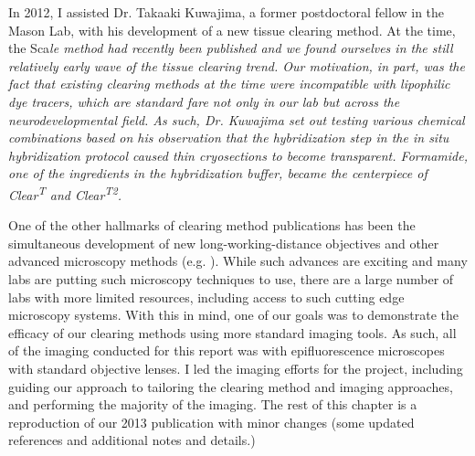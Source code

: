 In 2012, I assisted Dr. Takaaki Kuwajima, a former postdoctoral fellow in the Mason Lab, with his development of a new tissue clearing method.
At the time, the Sca\it{l}e method had recently been published \cite{hama2011scale} and we found ourselves in the still relatively early wave of the tissue clearing trend.
Our motivation, in part, was the fact that existing clearing methods at the time were incompatible with lipophilic dye tracers, which are standard fare not only in our lab but across the neurodevelopmental field.
As such, Dr. Kuwajima set out testing various chemical combinations based on his observation that the hybridization step in the \emph{in situ} hybridization protocol caused thin cryosections to become transparent.
Formamide, one of the ingredients in the hybridization buffer, became the centerpiece of {\it Clear\textsuperscript{T}} and {\it Clear\textsuperscript{T2}}.

One of the other hallmarks of clearing method publications has been the simultaneous development of new long-working-distance objectives and other advanced microscopy methods (e.g. ).
While such advances are exciting and many labs are putting such microscopy techniques to use, there are a large number of labs with more limited resources, including access to such cutting edge microscopy systems.
With this in mind, one of our goals was to demonstrate the efficacy of our clearing methods using more standard imaging tools.
As such, all of the imaging conducted for this report was with epifluorescence microscopes with standard objective lenses.
I led the imaging efforts for the project, including guiding our approach to tailoring the clearing method and imaging approaches, and performing the majority of the imaging.
The rest of this chapter is a reproduction of our 2013 publication \cite{kuwajima2013cleart} with minor changes (some updated references and additional notes and details.)
